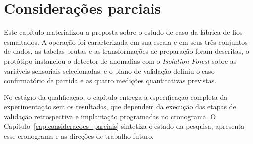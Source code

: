 \section{Considerações parciais}
\label{sec:consideracoes_cap5}

Este capítulo materializou a proposta sobre o estudo de caso da fábrica de fios esmaltados. A operação foi caracterizada em sua escala e em seus três conjuntos de dados, as tabelas brutas e as transformações de preparação foram descritas, o protótipo instanciou o detector de anomalias com o \emph{Isolation Forest} sobre as variáveis sensoriais selecionadas, e o plano de validação definiu o caso confirmatório de partida e as quatro medições quantitativas previstas.

No estágio da qualificação, o capítulo entrega a especificação completa da experimentação sem os resultados, que dependem da execução das etapas de validação retrospectiva e implantação programadas no cronograma. O Capítulo~\ref{cap:consideracoes_parciais} sintetiza o estado da pesquisa, apresenta esse cronograma e as direções de trabalho futuro.
